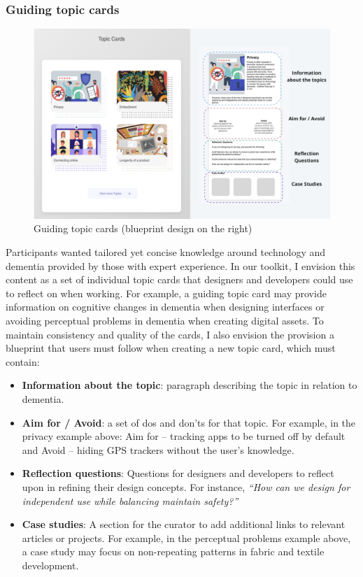 \subsubsection{Guiding topic cards}
\begin{figure}[h]
\centering
\includegraphics[width=1\linewidth]{Images/D3Toolkit/Fig9.png}
\caption{Guiding topic cards (blueprint design on the right)}
\label{fig:topicCards}
\end{figure}
Participants wanted tailored yet concise knowledge around technology and dementia provided by those with expert experience. In our toolkit, I envision this content as a set of individual topic cards that designers and developers could use to reflect on when working. For example, a guiding topic card may provide information on cognitive changes in dementia when designing interfaces or avoiding perceptual problems in dementia when creating digital assets. To maintain consistency and quality of the cards, I also envision the provision a blueprint that users must follow when creating a new topic card, which must contain:
\begin{itemize}
    \item \textbf{Information about the topic}: paragraph describing the topic in relation to dementia.
    \item \textbf{Aim for / Avoid}: a set of dos and don’ts for that topic. For example, in the privacy example above: Aim for – tracking apps to be turned off by default and Avoid – hiding GPS trackers without the user’s knowledge. 
    \item \textbf{Reflection questions}: Questions for designers and developers to reflect upon in refining their design concepts. For instance,\textit{ ``How can we design for independent use while balancing maintain safety?''}
    \item \textbf{Case studies}: A section for the curator to add additional links to relevant articles or projects. For example, in the perceptual problems example above, a case study may focus on non-repeating patterns in fabric and textile development.
\end{itemize}

